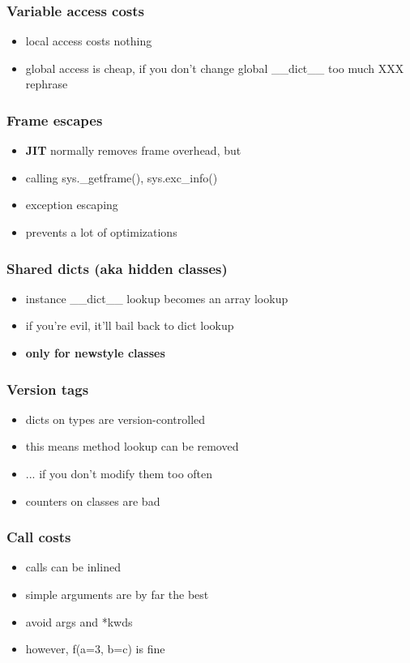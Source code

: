 \documentclass[utf8x, 14pt]{beamer}
\begin{document}
\begin{frame}
  \frametitle{Variable access costs}
  \begin{itemize}
    \item local access costs nothing
    \item global access is cheap, if you don't change global {\ttfamily \_\_dict\_\_} too much XXX rephrase
  \end{itemize}
\end{frame}

\begin{frame}
  \frametitle{Frame escapes}
  \begin{itemize}
    \item {\bf JIT} normally removes frame overhead, but
    \item calling {\ttfamily sys.\_getframe()}, {\ttfamily sys.exc\_info()}
    \item exception escaping
    \item prevents a lot of optimizations
  \end{itemize}
\end{frame}

\begin{frame}
  \frametitle{Shared dicts (aka hidden classes)}
  \begin{itemize}
    \item instance {\ttfamily \_\_dict\_\_ } lookup becomes an array lookup
    \item if you're evil, it'll bail back to dict lookup
      \pause
    \item {\bf only for newstyle classes}
  \end{itemize}
\end{frame}

\begin{frame}
  \frametitle{Version tags}
  \begin{itemize}
    \item dicts on types are version-controlled
    \item this means method lookup can be removed
      \pause
    \item ... if you don't modify them too often
    \item counters on classes are bad
  \end{itemize}
\end{frame}

\begin{frame}
  \frametitle{Call costs}
  \begin{itemize}
    \item calls can be inlined
    \item simple arguments are by far the best
    \item avoid {\ttfamily *args} and {\ttfamily **kwds}
    \item however, {\ttfamily f(a=3, b=c)} is fine
  \end{itemize}
\end{frame}
\end{document}
